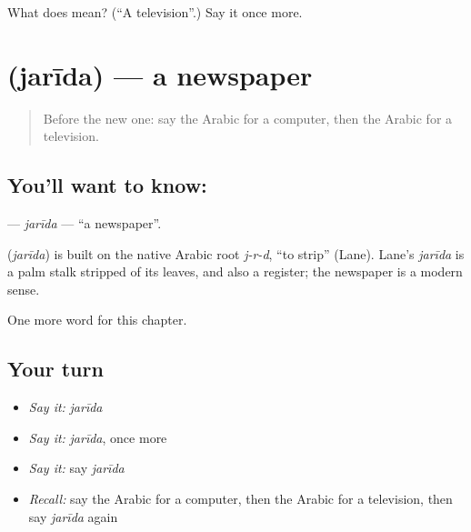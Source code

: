 \begin{tcolorbox}[breakable,colback=teal!4,colframe=teal!35!black,title={Before you move on}]
What does  mean? (\textquotedblleft{}A television\textquotedblright{}.) Say it once more.
\end{tcolorbox}
\section[\texorpdfstring{\ar{جريدة} (jarīda)}{جريدة (jarīda)}]{ (jarīda) — a newspaper}

\label{lesson:AR-C117-jarida}



\begin{quote}
Before the new one: say the Arabic for a computer, then the Arabic for a television.
\end{quote}

\subsection*{You'll want to know: }
\textbf{} — \emph{jarīda} — \textquotedblleft{}a newspaper\textquotedblright{}.

\begin{cousinweb}
\textbf{} (\emph{jarīda}) is built on the native Arabic root \emph{j-r-d}, \textquotedblleft{}to strip\textquotedblright{} (Lane). Lane's \emph{jarīda} is a palm stalk stripped of its leaves, and also a register; the newspaper is a modern sense.
\end{cousinweb}

\begin{grammarlens}[title={What you've built}]
One more word for this chapter.
\end{grammarlens}

\subsection*{Your turn}
\begin{itemize}
\raggedright
  \item \emph{Say it:} \emph{jarīda}
  \item \emph{Say it:} \emph{jarīda}, once more
  \item \emph{Say it:} say \emph{jarīda}
  \item \emph{Recall:} say the Arabic for a computer, then the Arabic for a television, then say \emph{jarīda} again
\end{itemize}

